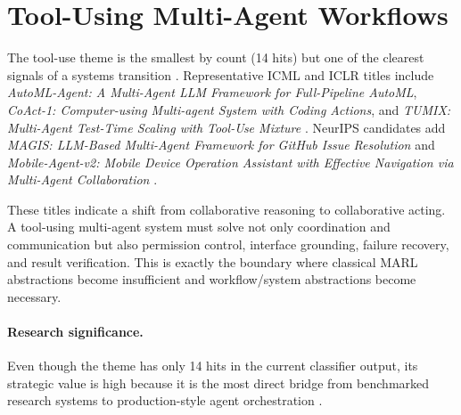 \documentclass[11pt]{article}
\begin{document}
\section{Tool-Using Multi-Agent Workflows}
The tool-use theme is the smallest by count (14 hits) but one of the clearest signals of a systems transition \cite{theme_synthesis}. Representative ICML and ICLR titles include \emph{AutoML-Agent: A Multi-Agent LLM Framework for Full-Pipeline AutoML}, \emph{CoAct-1: Computer-using Multi-agent System with Coding Actions}, and \emph{TUMIX: Multi-Agent Test-Time Scaling with Tool-Use Mixture} \cite{icml_list,iclr_subset}. NeurIPS candidates add \emph{MAGIS: LLM-Based Multi-Agent Framework for GitHub Issue Resolution} and \emph{Mobile-Agent-v2: Mobile Device Operation Assistant with Effective Navigation via Multi-Agent Collaboration} \cite{neurips_list}.

These titles indicate a shift from collaborative reasoning to collaborative acting. A tool-using multi-agent system must solve not only coordination and communication but also permission control, interface grounding, failure recovery, and result verification. This is exactly the boundary where classical MARL abstractions become insufficient and workflow/system abstractions become necessary.

\paragraph{Research significance.}
Even though the theme has only 14 hits in the current classifier output, its strategic value is high because it is the most direct bridge from benchmarked research systems to production-style agent orchestration \cite{future_directions}.
\end{document}
